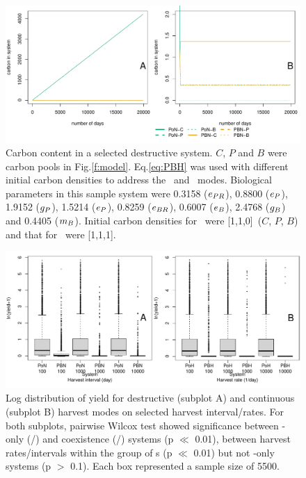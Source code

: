 \documentclass[../thesis.tex]{subfiles} %
\begin{document}
\begin{figure}[H]
    \centering
    \includegraphics[width=\linewidth]{result/Sample.pdf}
    \caption[Carbon content in a sample destructive system]{Carbon content in a selected destructive system.  $C$, $P$ and $B$ were carbon pools in Fig.\ref{f:model}.  Eq.\ref{eq:PBH} was used with different initial carbon densities to address the \PoN\ and \PBN\ modes.  Biological parameters in this sample system were 0.3158 ($e_{PR}$), 0.8800 ($e_P$), 1.9152 ($g_P$), 1.5214 ($e_P$), 0.8259 ($e_{BR}$), 0.6007 ($e_B$), 2.4768 ($g_B$) and 0.4405 ($m_B$).  Initial carbon densities for \PoN\ were [1,1,0]\den\ ($C$, $P$, $B$) and that for \PBN\ were [1,1,1]\den.}
    \label{f:destCarbon}
\end{figure}

\begin{figure}[H]
    \centering
    \includegraphics[width=\linewidth]{result/Harvest.pdf}
    \caption[Yield flux distribution by harvest mode]{Log distribution of yield for destructive (subplot A) and continuous (subplot B) harvest modes on selected harvest interval/rates.  For both subplots, pairwise Wilcox test showed significance between \phy-only (\PoH/\PoN) and coexistence (\PBH/\PBN) systems (p $\ll$ 0.01), between harvest rates/intervals within the group of \pbs s (p $\ll$ 0.01) but not \phy-only systems (p $>$ 0.1).  Each box represented a sample size of 5500.}
    \label{f:ydByHarv}
\end{figure}
\end{document}
